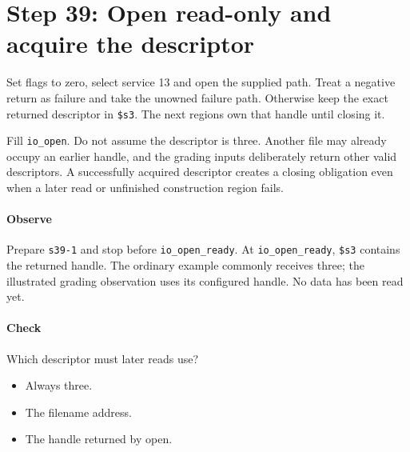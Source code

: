 \section{Step 39: Open read-only and acquire the descriptor}
Set flags to zero, select service 13 and open the supplied path. Treat a
negative return as failure and take the unowned failure path. Otherwise keep
the exact returned descriptor in \texttt{\$s3}. The next regions own that
handle until closing it.

Fill \texttt{io\_open}. Do not assume the descriptor is three. Another file
may already occupy an earlier handle, and the grading inputs deliberately return
other valid descriptors. A successfully acquired descriptor creates a closing
obligation even when a later read or unfinished construction region fails.

\paragraph{Observe} Prepare \texttt{s39-1} and stop before
\texttt{io\_open\_ready}. At \texttt{io\_open\_ready}, \texttt{\$s3} contains the
returned handle. The ordinary example commonly receives three; the illustrated
grading observation uses its configured handle. No data has been read yet.

\paragraph{Check} Which descriptor must later reads use?
\begin{itemize}
  \item[A.] Always three.
  \item[B.] The filename address.
  \item[C.] The handle returned by open.
\end{itemize}
